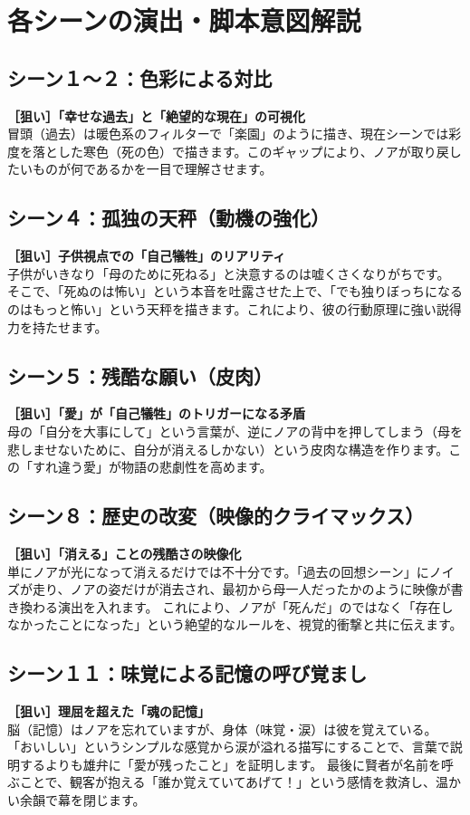 \clearpage\section{各シーンの演出・脚本意図解説}
\subsection{シーン１〜２：色彩による対比}
\textbf{［狙い］「幸せな過去」と「絶望的な現在」の可視化} \\
冒頭（過去）は暖色系のフィルターで「楽園」のように描き、現在シーンでは彩度を落とした寒色（死の色）で描きます。このギャップにより、ノアが取り戻したいものが何であるかを一目で理解させます。

\subsection{シーン４：孤独の天秤（動機の強化）}
\textbf{［狙い］子供視点での「自己犠牲」のリアリティ} \\
子供がいきなり「母のために死ねる」と決意するのは嘘くさくなりがちです。
そこで、「死ぬのは怖い」という本音を吐露させた上で、「でも独りぼっちになるのはもっと怖い」という天秤を描きます。これにより、彼の行動原理に強い説得力を持たせます。

\subsection{シーン５：残酷な願い（皮肉）}
\textbf{［狙い］「愛」が「自己犠牲」のトリガーになる矛盾} \\
母の「自分を大事にして」という言葉が、逆にノアの背中を押してしまう（母を悲しませないために、自分が消えるしかない）という皮肉な構造を作ります。この「すれ違う愛」が物語の悲劇性を高めます。

\subsection{シーン８：歴史の改変（映像的クライマックス）}
\textbf{［狙い］「消える」ことの残酷さの映像化} \\
単にノアが光になって消えるだけでは不十分です。「過去の回想シーン」にノイズが走り、ノアの姿だけが消去され、最初から母一人だったかのように映像が書き換わる演出を入れます。
これにより、ノアが「死んだ」のではなく「存在しなかったことになった」という絶望的なルールを、視覚的衝撃と共に伝えます。

\subsection{シーン１１：味覚による記憶の呼び覚まし}
\textbf{［狙い］理屈を超えた「魂の記憶」} \\
脳（記憶）はノアを忘れていますが、身体（味覚・涙）は彼を覚えている。
「おいしい」というシンプルな感覚から涙が溢れる描写にすることで、言葉で説明するよりも雄弁に「愛が残ったこと」を証明します。
最後に賢者が名前を呼ぶことで、観客が抱える「誰か覚えていてあげて！」という感情を救済し、温かい余韻で幕を閉じます。

